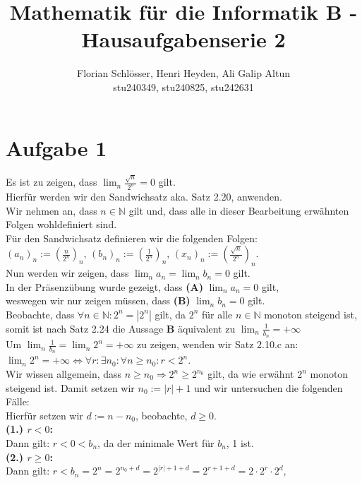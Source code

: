 \documentclass[12pt, a4paper]{article}
\title{Mathematik für die Informatik B - Hausaufgabenserie 2}
\author{Florian Schlösser, Henri Heyden, Ali Galip Altun \\ \small stu240349, stu240825, stu242631}
\date{}
\begin{document}
\maketitle

\doublespacing
\section*{Aufgabe 1}
Es ist zu zeigen, dass $\lim_{n}\frac{\sqrt{n}}{2^n} = 0$ gilt. \\
Hierfür werden wir den Sandwichsatz aka. Satz 2.20, anwenden. \\
Wir nehmen an, dass $n \in \mathbb{N}$ gilt und, dass alle in dieser Bearbeitung erwähnten Folgen wohldefiniert sind. \\
Für den Sandwichsatz definieren wir die folgenden Folgen: \\ $(a_n)_n := \left(\frac{n}{2^n}\right)_n$, $(b_n)_n := \left(\frac{1}{2^n}\right)_n$, $(x_n)_n := \left(\frac{\sqrt{n}}{2^n}\right)_n$.\\
Nun werden wir zeigen, dass $\lim_{n}a_n = \lim_{n}b_n = 0$ gilt. \\
In der Präsenzübung wurde gezeigt, dass \textbf{(A)} $\lim_{n}a_n = 0$ gilt, \\
weswegen wir nur zeigen müssen, dass \textbf{(B)} $\lim_{n}b_n = 0$ gilt. \\
Beobachte, dass $\forall n \in \mathbb N: 2^n = |2^n|$ gilt, da $2^n$ für alle $n \in \mathbb N$ monoton steigend ist, somit ist nach Satz 2.24 die Aussage \textbf{B} äquivalent zu $\lim_{n}\frac{1}{b_n} = +\infty$ \\
Um $\lim_{n}\frac{1}{b_n} = \lim_{n}2^n = +\infty$ zu zeigen, wenden wir Satz 2.10.c an: \\
$\lim_{n}2^n = +\infty \Longleftrightarrow \forall r: \exists n_0: \forall n \ge n_0: r < 2^n$. \\
Wir wissen allgemein, dass $n \ge n_0 \Rightarrow 2^n \ge 2^{n_0}$ gilt, da wie erwähnt $2^n$ monoton steigend ist.
Damit setzen wir $n_0 := |r| + 1$ und wir untersuchen die folgenden Fälle:\\
Hierfür setzen wir $d:= n - n_0$, beobachte, $d \ge 0$. \\
\textbf{(1.) $r < 0$:} \\
Dann gilt: $r < 0 < b_n$, da der minimale Wert für $b_n$, 1 ist. \\
\textbf{(2.) $r \ge 0$:} \\
Dann gilt: $r < b_n = 2^{n} = 2^{n_0 + d} = 2^{|r| + 1 + d} = 2^{r + 1 + d} = 2 \cdot 2^r \cdot 2^d$, \\
\end{document}

